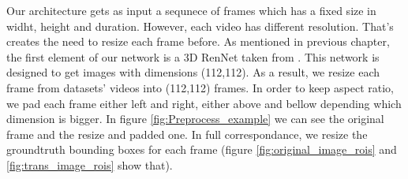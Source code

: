 Our architecture gets as input a sequnece of frames which has a fixed size in widht, height and duration. However, each video has different resolution. That's creates the
need to resize each frame before. As mentioned in previous chapter, the first element of our network is a 3D RenNet taken from \cite{hara3dcnns}. This network is designed to
get images with dimensions (112,112). As a result, we resize each frame from datasets' videos into (112,112) frames. In order to keep aspect ratio, we pad each frame either
left and right, either above and bellow depending which dimension is bigger. In figure  \ref{fig:Preprocess_example} we can see the original frame and the resize and padded one.
In full correspondance, we resize the groundtruth bounding boxes for each frame (figure \ref{fig:original_image_rois} and \ref{fig:trans_image_rois} show that).


